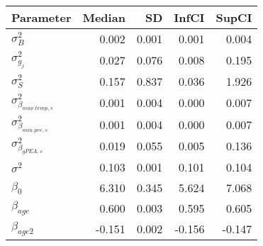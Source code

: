 \begin{table}[ht]
\centering
\begin{tabular}{lrrrr}
  \hline
Parameter & Median & SD & InfCI & SupCI \\ 
  \hline
$\sigma^{2}_{B}$ & 0.002 & 0.001 & 0.001 & 0.004 \\ 
  $\sigma^{2}_{g_{j}}$ & 0.027 & 0.076 & 0.008 & 0.195 \\ 
  $\sigma^{2}_{S}$ & 0.157 & 0.837 & 0.036 & 1.926 \\ 
  $\sigma^{2}_{\beta_{max.temp,s}}$ & 0.001 & 0.004 & 0.000 & 0.007 \\ 
  $\sigma^{2}_{\beta_{min.pre,s}}$ & 0.001 & 0.004 & 0.000 & 0.007 \\ 
  $\sigma^{2}_{\beta_{gPEA,s}}$ & 0.019 & 0.055 & 0.005 & 0.136 \\ 
  $\sigma^{2}$ & 0.103 & 0.001 & 0.101 & 0.104 \\ 
  $\beta_{0}$ & 6.310 & 0.345 & 5.624 & 7.068 \\ 
  $\beta_{age}$ & 0.600 & 0.003 & 0.595 & 0.605 \\ 
  $\beta_{age2}$ & -0.151 & 0.002 & -0.156 & -0.147 \\ 
   \hline
\end{tabular}
\end{table}

